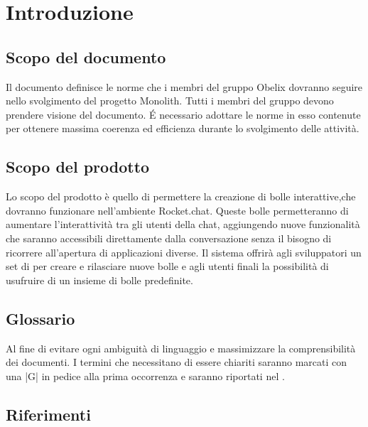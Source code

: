 \section{Introduzione}

\subsection{Scopo del documento}

Il documento definisce le norme che i membri del gruppo Obelix
dovranno seguire nello svolgimento del progetto Monolith. Tutti i
membri del gruppo devono prendere visione del documento. \'E necessario
adottare le norme in esso contenute per ottenere massima coerenza ed
efficienza durante lo svolgimento delle attività. 

\subsection{Scopo del prodotto}

Lo scopo del prodotto è quello di permettere la creazione 
di bolle interattive,che dovranno funzionare nell’ambiente
Rocket.chat. Queste bolle permetteranno di aumentare l'interattività
tra gli utenti della chat, aggiungendo nuove funzionalità che
saranno accessibili direttamente dalla conversazione senza il bisogno
di ricorrere all'apertura di applicazioni diverse. 
Il sistema offrirà agli sviluppatori un set di  per creare e
rilasciare nuove bolle e agli utenti finali la possibilità di
usufruire di un insieme di bolle predefinite.  

\subsection{Glossario}

Al fine di evitare ogni ambiguità di linguaggio e massimizzare la
comprensibilità dei documenti. I termini che necessitano di essere
chiariti saranno marcati con una |G| in pedice alla prima occorrenza e saranno
riportati nel \gloss. 

\subsection{Riferimenti}

